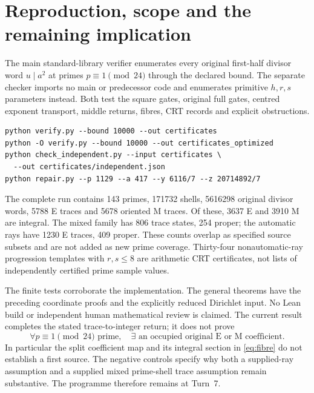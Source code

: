 \section{Reproduction, scope and the remaining implication}
The main standard-library verifier enumerates every original first-half divisor
word \(u\mid a^2\) at primes $p\equiv1\pmod{24}$ through the declared bound. The separate
checker imports no main or predecessor code and enumerates primitive $h,r,s$
parameters instead. Both test the square gates, original full gates, centred
exponent transport, middle returns, fibres, CRT records and explicit obstructions.
\begin{verbatim}
python verify.py --bound 10000 --out certificates
python -O verify.py --bound 10000 --out certificates_optimized
python check_independent.py --input certificates \
  --out certificates/independent.json
python repair.py --p 1129 --a 417 --y 6116/7 --z 20714892/7
\end{verbatim}
The complete run contains 143 primes, 171732 shells, 5616298 original divisor
words, 5788 E traces and 5678 oriented M traces. Of these, 3637 E and 3910 M
are integral. The mixed family has 806 trace states, 254 proper; the automatic
rays have 1230 E traces, 409 proper. These counts overlap as specified source
subsets and are not added as new prime coverage. Thirty-four nonautomatic-ray
progression templates with $r,s\le8$ are arithmetic CRT certificates, not lists
of independently certified prime sample values.

The finite tests corroborate the implementation. The general theorems have
the preceding coordinate proofs and the explicitly reduced Dirichlet input.
No Lean build or independent human mathematical review is claimed. The current
result completes the stated trace-to-integer return; it does not prove
\[
 \forall p\equiv1\pmod{24}\text{ prime},\quad
 \exists\text{ an occupied original E or M coefficient}.
\]
In particular the split coefficient map and its integral section in
\eqref{eq:fibre} do not establish a first source. The negative controls specify
why both a supplied-ray assumption and a supplied mixed prime-shell trace
assumption remain substantive. The programme therefore remains at Turn~7.
